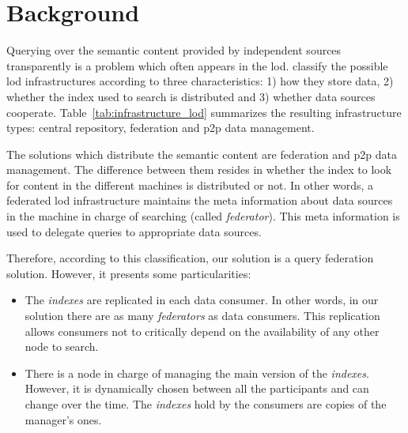 \section{Background}
\label{background}

Querying over the semantic content provided by independent sources transparently is a problem which often appears in the \acl{lod}.
\citet{gorlitz_federated_2011} classify the possible \ac{lod} infrastructures according to three characteristics:
1) how they store data,
2) whether the index used to search is distributed and
3) whether data sources cooperate.
Table~\ref{tab:infrastructure_lod} summarizes the resulting infrastructure types: central repository, federation and \ac{p2p} data management.





The solutions which distribute the semantic content are federation and \ac{p2p} data management.
The difference between them resides in whether the index to look for content in the different machines is distributed or not.
In other words, a federated \ac{lod} infrastructure maintains the meta information about data sources in the machine in charge of searching \citep{gorlitz_federated_2011} (called \emph{federator}).
This meta information is used to delegate queries to appropriate data sources.

Therefore, according to this classification, our solution is a query federation solution.
However, it presents some particularities:
\begin{itemize}
  \item The \emph{indexes} are replicated in each data consumer.
	In other words, in our solution there are as many \emph{federators} as data consumers.
	This replication allows consumers not to critically depend on the availability of any other node to search. %
  \item There is a node in charge of managing the main version of the \emph{indexes}.
	However, it is dynamically chosen between all the participants and can change over the time.
	The \emph{indexes} hold by the consumers are copies of the manager's ones.
\end{itemize}


